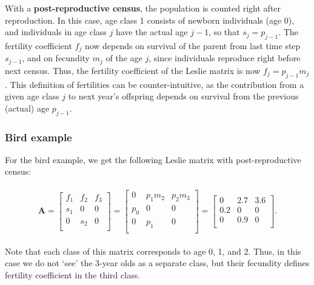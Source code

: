 \documentclass[
]{book}
\begin{document}
With a \textbf{post-reproductive census}, the population is counted right after reproduction. In this case, age class 1 consists of newborn individuals (age 0), and individuals in age class \(j\) have the actual age \(j-1\), so that \(s_j=p_{j-1}\). The fertility coefficient \(f_j\) now depends on survival of the parent from last time step \(s_{j-1}\), and on fecundity \(m_{j}\) of the age \(j\), since individuals reproduce right before next census. Thus, the fertility coefficient of the Leslie matrix is now \(f_j=p_{j-1}m_{j}\). This definition of fertilities can be counter-intuitive, as the contribution from a given age class \(j\) to next year's offspring depends on survival from the previous (actual) age \(p_{j-1}\).

\hypertarget{bird-example-5}{%
\subsubsection*{Bird example}\label{bird-example-5}}

For the bird example, we get the following Leslie matrix with post-reproductive census:

\begin{align}
\begin{split}
\mathbf{A}=\left[\begin{matrix} f_1 & f_2 &f_3  \\ s_1 &0&0\\ 0 & s_2 &0  \\  \end{matrix}\right]=\left[\begin{matrix} 0 & p_1m_2 &p_2m_3  \\ p_0 &0&0\\ 0 & p_1 &0  \\  \end{matrix}\right]=\left[\begin{matrix} 0 &2.7 &3.6  \\ 0.2 &0&0\\ 0 & 0.9 &0  \\  \end{matrix}\right].
\end{split}
\label{eq:Postrep}
\end{align}

Note that each class of this matrix corresponds to age 0, 1, and 2. Thus, in this case we do not `see' the 3-year olds as a separate class, but their fecundity defines fertility coefficient in the third class.
\end{document}
